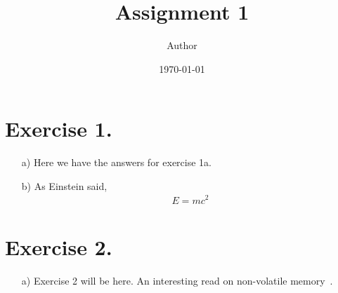 \documentclass{article}
\title{Assignment 1}
\author{Author}
\date{\today}
\begin{document}
\maketitle

\section{Exercise 1.}
\begin{enumerate}
    \item [a)] Here we have the answers for exercise 1a.

    \item [b)] As Einstein said,
          \begin{equation*}
              \begin{split}
                  E = mc^2
              \end{split}
          \end{equation*}
\end{enumerate}

\section{Exercise 2.}
\begin{enumerate}
    \item [a)]  Exercise 2 will be here. An interesting read on non-volatile memory~\cite{inproceedings:pmemguide}.
\end{enumerate}



\end{document}
